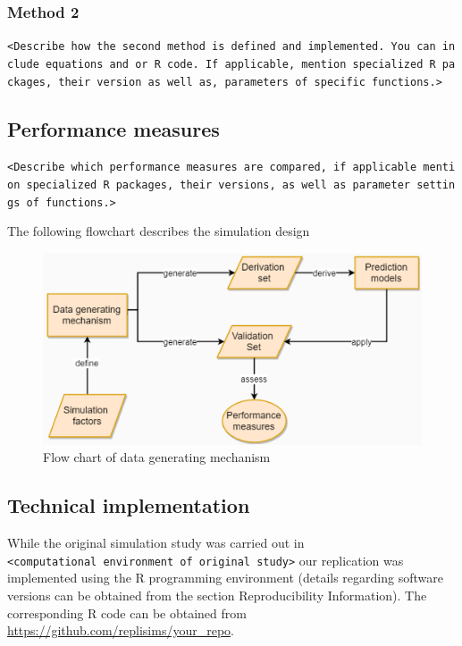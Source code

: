 \documentclass[10,a4paperpaper,]{article}
\begin{document}
\subsubsection{Method 2}

\texttt{\textless{}Describe\ how\ the\ second\ method\ is\ defined\ and\ implemented.\ You\ can\ include\ equations\ and\ or\ R\ code.\ If\ applicable,\ mention\ specialized\ R\ packages,\ their\ version\ as\ well\ as,\ parameters\ of\ specific\ functions.\textgreater{}}

\subsection{Performance measures}

\texttt{\textless{}Describe\ which\ performance\ measures\ are\ compared,\ if\ applicable\ mention\ specialized\ R\ packages,\ their\ versions,\ as\ well\ as\ parameter\ settings\ of\ functions.\textgreater{}}

The following flowchart describes the simulation design

\begin{figure}
\includegraphics[width=450pt]{flowchart} \caption{Flow chart of data generating mechanism}\label{fig:unnamed-chunk-1}
\end{figure}

\subsection{Technical implementation}

While the original simulation study was carried out in
\texttt{\textless{}computational\ environment\ of\ original\ study\textgreater{}}
our replication was implemented using the R programming environment
(details regarding software versions can be obtained from the section
Reproducibility Information). The corresponding R code can be obtained
from \url{https://github.com/replisims/your_repo}.
\end{document}
